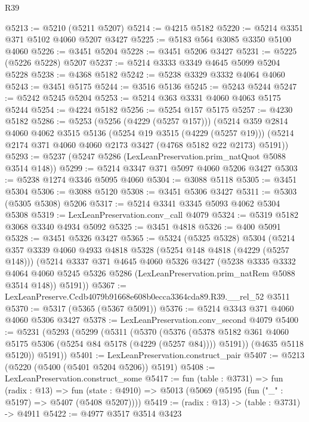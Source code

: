 \begin{lexlean}{R39}
\begin{coremodule}
@5213 := @5210 (@5211 @5207)
@5214 := @4215 @5182
@5220 := @5214 @3351 @371 @5102 @4060 @5207 @3427
@5225 := @5183 @564 @3085 @3350 @5100 @4060
@5226 := @3451 @5204
@5228 := @3451 @5206 @3427
@5231 := @5225 (@5226 @5228) @5207
@5237 := @5214 @3333 @3349 @4645 @5099 @5204 @5228
@5238 := @4368 @5182
@5242 := @5238 @3329 @3332 @4064 @4060
@5243 := @3451 @5175
@5244 := @3516 @5136
@5245 := @5243 @5244
@5247 := @5242 @5245 @5204
@5253 := @5214 @363 @3331 @4060 @4063 @5175 @5244
@5254 := @4224 @5182
@5256 := @5254 @157 @5175
@5257 := @4230 @5182
@5286 := @5253
    (@5256 (@4229 (@5257 @157)))
    (@5214
      @359
      @2814
      @4060
      @4062
      @3515
      @5136
      (@5254 @19 @3515 (@4229 (@5257 @19)))
      (@5214 @2174 @371 @4060 @4060 @2173 @3427 (@4768 @5182 @22 @2173) @5191))
@5293 := @5237 (@5247 @5286 (LexLeanPreservation.prim_natQuot @5088 @3514 @148))
@5299 := @5214 @3347 @371 @5097 @4060 @5206 @3427
@5303 := @5238 @1274 @3346 @5095 @4060
@5304 := @3088 @5118
@5305 := @3451 @5304
@5306 := @3088 @5120
@5308 := @3451 @5306 @3427
@5311 := @5303 (@5305 @5308) @5206
@5317 := @5214 @3341 @3345 @5093 @4062 @5304 @5308
@5319 := LexLeanPreservation.conv_call @4079
@5324 := @5319 @5182 @3068 @3340 @4934 @5092
@5325 := @3451 @4818
@5326 := @400 @5091
@5328 := @3451 @5326 @3427
@5365 := @5324
    (@5325 @5328)
    @5304
    (@5214
      @357
      @3339
      @4060
      @4933
      @4818
      @5328
      (@5254 @148 @4818 (@4229 (@5257 @148)))
      (@5214
        @3337
        @371
        @4645
        @4060
        @5326
        @3427
        (@5238
          @3335
          @3332
          @4064
          @4060
          @5245
          @5326
          @5286
          (LexLeanPreservation.prim_natRem @5088 @3514 @148))
        @5191))
@5367 := LexLeanPreserve.Ccdb4079b91668e608b0ecca3364cda89.R39.__rel_52 @3511
@5370 := @5317 (@5365 (@5367 @5091))
@5376 := @5214 @3343 @371 @4060 @4060 @5306 @3427
@5378 := LexLeanPreservation.conv_second @4079
@5400 := @5231
    (@5293
      (@5299
        (@5311
          (@5370
            (@5376
              (@5378 @5182 @361 @4060 @5175 @5306 (@5254 @84 @5178 (@4229 (@5257 @84))))
              @5191))
          (@4635 @5118 @5120))
        @5191))
@5401 := LexLeanPreservation.construct_pair
@5407 := @5213 (@5220 (@5400 (@5401 @5204 @5206)) @5191)
@5408 := LexLeanPreservation.construct_some
@5417 := fun (table : @3731) =>
  fun (radix : @13) =>
  fun (state : @4910) => @5013 (@5069 (@5195 (fun ("_" : @5197) => @5407 (@5408 @5207))))
@5419 := (radix : @13) -> (table : @3731) -> @4911
@5422 := @4977 @3517 @3514 @3423

\end{coremodule}
\end{lexlean}
